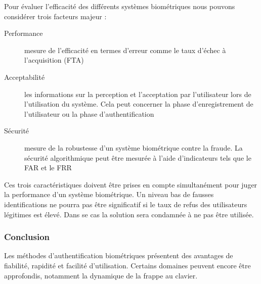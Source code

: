 Pour évaluer l'efficacité des différents systèmes biométriques nous pouvons considérer trois facteurs majeur\cite{elabedThese} :\\

\begin{description}
\item[Performance] mesure de l'efficacité en termes d'erreur comme le taux d'échec à l'acquisition (FTA)
\item[Acceptabilité] les informations sur la perception et l'acceptation par l'utilisateur lors de l'utilisation du système. Cela peut concerner la phase d'enregistrement de l'utilisateur\cite{giotSVM} ou la phase d'authentification 
\item[Sécurité] mesure de la robustesse d'un système biométrique contre la fraude. La sécurité algorithmique peut être mesurée à l'aide d'indicateurs tels que le FAR et le FRR\\
\end{description}

Ces trois caractéristiques doivent être prises en compte simultanément pour juger la performance d'un système biométrique. Un niveau bas de fausses identifications ne pourra pas être significatif si le taux de refus des utilisateurs légitimes est élevé. Dans se cas la solution sera condamnée à ne pas être utilisée.

\subsubsection{Conclusion}

Les méthodes d'authentification biométriques présentent des avantages de fiabilité, rapidité et facilité d'utilisation. Certains domaines peuvent encore être approfondis, notamment la dynamique de la frappe au clavier.
